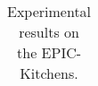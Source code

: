 \begin{table}[!ht]
\begin{center}
{\begin{tabular}{ l c  c c  c c  c }
\bottomrule
\end{tabular}}
\end{center}
\caption{Experimental results on the EPIC-Kitchens.
}
\label{epic-kitchens}
\vspace{-0.3cm}
\end{table}

